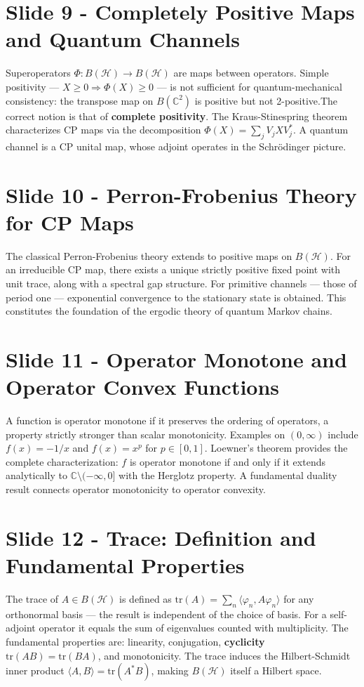 \documentclass{article}
\begin{document}
\section*{Slide 9 - Completely Positive Maps and Quantum Channels}
Superoperators $\Phi:B(\mathcal{H})\rightarrow B(\mathcal{H})$ are maps between operators. \newline Simple positivity — $X \geq0\Rightarrow \Phi(X)\geq0$ — is not sufficient for quantum-mechanical consistency: the transpose map on $B(\mathbb{C}^2)$ is positive but not 2-positive.\newline The correct notion is that of \textbf{complete positivity}. The Kraus-Stinespring theorem characterizes CP maps via the decomposition $\Phi(X)=\sum_jV_jXV_j^*$. A quantum channel is a CP unital map, whose adjoint operates in the Schrödinger picture.

\section*{Slide 10 - Perron-Frobenius Theory for CP Maps}
The classical Perron-Frobenius theory extends to positive maps on $B(\mathcal{H})$. For an irreducible CP map, there exists a unique strictly positive fixed point with unit trace, along with a spectral gap structure. For primitive channels — those of period one — exponential convergence to the stationary state is obtained. This constitutes the foundation of the ergodic theory of quantum Markov chains.

\section*{Slide 11 - Operator Monotone and Operator Convex Functions}
A function is operator monotone if it preserves the ordering of operators, a property strictly stronger than scalar monotonicity. Examples on $(0,\infty)$
include $f(x)=-1/x$ and $f(x)=x^p$ for $p \in [0,1]$. Loewner's theorem provides the complete characterization: $f$ is operator monotone if and only if it extends analytically to $\mathbb{C} \setminus (-\infty, 0]$ with the Herglotz property. A fundamental duality result connects operator monotonicity to operator convexity.
\newpage

\section*{Slide 12 - Trace: Definition and Fundamental Properties}
The trace of $A \in B(\mathcal{H})$ is defined as $\mathrm{tr}(A) = \sum_n \langle \varphi_n, A\varphi_n \rangle$ for any orthonormal basis — the result is independent of the choice of basis. For a self-adjoint operator it equals the sum of eigenvalues counted with multiplicity. The fundamental properties are: linearity, conjugation, \textbf{cyclicity} $\mathrm{tr}(AB) = \mathrm{tr}(BA)$, and monotonicity. The trace induces the Hilbert-Schmidt inner product $\langle A, B \rangle = \mathrm{tr}(A^*B)$, making $B(\mathcal{H})$ itself a Hilbert space.
\end{document}
